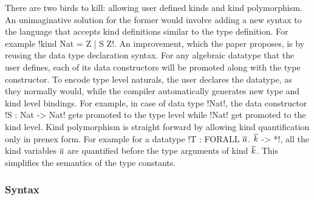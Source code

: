 \documentclass[manuscript,screen,nonacm]{acmart}
\begin{document}
There are two birds to kill: allowing user defined kinds and kind polymorphism. An unimaginative solution for the former would involve adding a new syntax to the language that accepts kind definitions similar to the type definition. For example !kind Nat = Z | S Z!. An improvement, which the paper proposes, is by reusing the data type declaration syntax. For any algebraic datatype that the user defines, each of its data constructors will be promoted along with the type constructor. To encode type level naturals, the user declares the datatype, as they normally would, while the compiler automatically generates new type and kind level bindings. For example, in case of data type !Nat!, the data constructor !S : Nat -> Nat! gets promoted to the type level while !Nat! get promoted to the kind level. Kind polymorphism is straight forward by allowing kind quantification only in prenex form. For example for a datatype !T : FORALL $\overline{a}$. $\overline{k}$ -> *!, all the kind variables $\overline{a}$ are quantified before the type arguments of kind $\overline{k}$. This simplifies the semantics of the type constants.

\subsubsection{Syntax}
\end{document}
